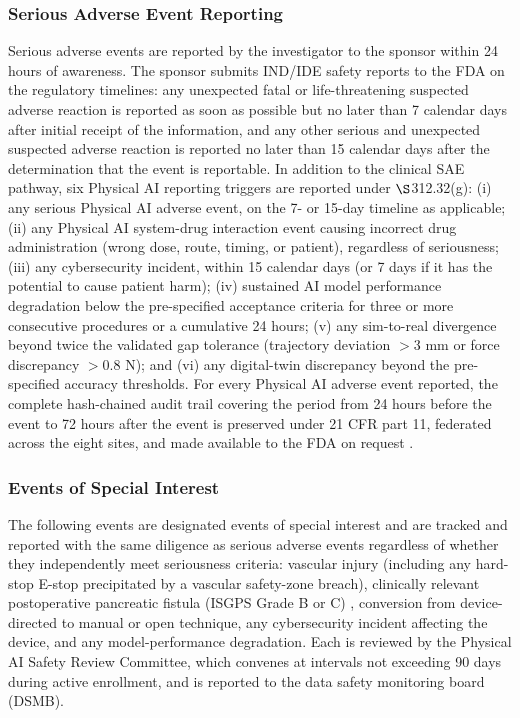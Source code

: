 \clearpage

\subsubsection{Serious Adverse Event Reporting}

Serious adverse events are reported by the investigator to the sponsor within
24 hours of awareness. The sponsor submits IND/IDE safety reports to the FDA on the
regulatory timelines: any unexpected fatal or life-threatening suspected adverse
reaction is reported as soon as possible but no later than 7 calendar days after
initial receipt of the information, and any other serious and unexpected suspected
adverse reaction is reported no later than 15 calendar days after the determination
that the event is reportable. In addition to the clinical SAE pathway, six Physical
AI reporting triggers are reported under $\S$312.32(g): (i) any serious Physical AI
adverse event, on the 7- or 15-day timeline as applicable; (ii) any Physical AI
system-drug interaction event causing incorrect drug administration (wrong dose,
route, timing, or patient), regardless of seriousness; (iii) any cybersecurity
incident, within 15 calendar days (or 7 days if it has the potential to cause patient
harm); (iv) sustained AI model performance degradation below the pre-specified
acceptance criteria for three or more consecutive procedures or a cumulative 24
hours; (v) any sim-to-real divergence beyond twice the validated gap tolerance
(trajectory deviation $> 3$ mm or force discrepancy $> 0.8$ N); and (vi) any
digital-twin discrepancy beyond the pre-specified accuracy thresholds. For every
Physical AI adverse event reported, the complete hash-chained audit trail covering
the period from 24 hours before the event to 72 hours after the event is preserved
under 21 CFR part 11, federated across the eight sites, and made available to the FDA
on request \cite{ecfr2026part11}.

\subsubsection{Events of Special Interest}

The following events are designated events of special interest and are tracked and
reported with the same diligence as serious adverse events regardless of whether they
independently meet seriousness criteria: vascular injury (including any hard-stop
E-stop precipitated by a vascular safety-zone breach), clinically relevant
postoperative pancreatic fistula (ISGPS Grade B or C) \cite{Bassi2017}, conversion
from device-directed to manual or open technique, any cybersecurity incident
affecting the device, and any model-performance degradation. Each is reviewed by the
Physical AI Safety Review Committee, which convenes at intervals not exceeding 90 days
during active enrollment, and is reported to the data safety monitoring board (DSMB).

